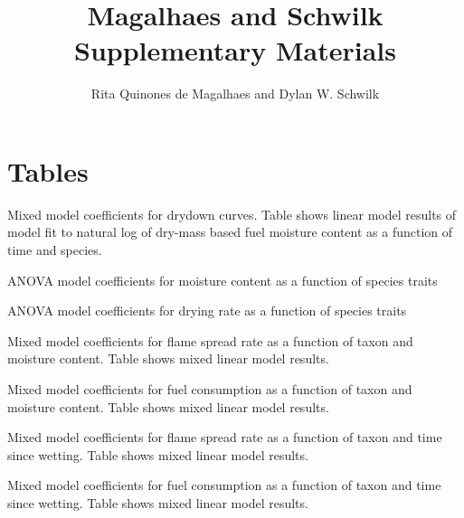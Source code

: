 \documentclass[letterpaper]{article}
\title{Magalhaes and Schwilk Supplementary Materials}
\author{Rita Quinones de Magalhaes and Dylan W. Schwilk}
\date{}
\begin{document}
\maketitle

\section{Tables}

\begin{table}[H]
  \caption{Mixed model coefficients for drydown curves. Table shows linear model results of model fit to  natural log of dry-mass based fuel moisture content as a function of time and species.} 
  \label{tabS1}
\centering

\end{table}

\begin{table}[H]
  \caption{ANOVA model coefficients for moisture content as a function of species traits} 
  \label{tabS2}
\centering

\end{table}

\begin{table}[H]
  \caption{ANOVA model coefficients for drying rate as a function of species traits} 
  \label{tabS3}
\centering

\end{table}

\begin{table}[H]
  \caption{Mixed model coefficients for flame spread rate as a function of taxon and moisture content. Table shows mixed linear model results.} 
  \label{tabS4}
\centering

\end{table}

\begin{table}[H]
  \caption{Mixed model coefficients for fuel consumption as a function of taxon and moisture content. Table shows mixed linear model results.} 
  \label{tabS5}
\centering

\end{table}


\begin{table}[H]
  \caption{Mixed model coefficients for flame spread rate as a function of taxon and time since wetting. Table shows mixed linear model results.} 
  \label{tabS6}
\centering

\end{table}

\begin{table}[H]
  \caption{Mixed model coefficients for fuel consumption as a function of taxon and time since wetting. Table shows mixed linear model results.} 
  \label{tabS7}
\centering

\end{table}
\end{document}
